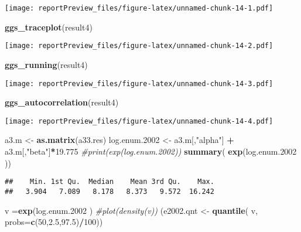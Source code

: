 \documentclass[]{article}
\newenvironment{Shaded}{\begin{snugshade}}{\end{snugshade}}
\newcommand{\KeywordTok}[1]{\textcolor[rgb]{0.13,0.29,0.53}{\textbf{#1}}}
\newcommand{\DataTypeTok}[1]{\textcolor[rgb]{0.13,0.29,0.53}{#1}}
\newcommand{\DecValTok}[1]{\textcolor[rgb]{0.00,0.00,0.81}{#1}}
\newcommand{\FloatTok}[1]{\textcolor[rgb]{0.00,0.00,0.81}{#1}}
\newcommand{\StringTok}[1]{\textcolor[rgb]{0.31,0.60,0.02}{#1}}
\newcommand{\CommentTok}[1]{\textcolor[rgb]{0.56,0.35,0.01}{\textit{#1}}}
\newcommand{\OperatorTok}[1]{\textcolor[rgb]{0.81,0.36,0.00}{\textbf{#1}}}
\newcommand{\NormalTok}[1]{#1}
\begin{document}
\texttt{[image: reportPreview\_files/figure-latex/unnamed-chunk-14-1.pdf]}

\begin{Shaded}
\begin{Highlighting}[]
\KeywordTok{ggs_traceplot}\NormalTok{(result4)}
\end{Highlighting}
\end{Shaded}

\texttt{[image: reportPreview\_files/figure-latex/unnamed-chunk-14-2.pdf]}

\begin{Shaded}
\begin{Highlighting}[]
\KeywordTok{ggs_running}\NormalTok{(result4)}
\end{Highlighting}
\end{Shaded}

\texttt{[image: reportPreview\_files/figure-latex/unnamed-chunk-14-3.pdf]}

\begin{Shaded}
\begin{Highlighting}[]
\KeywordTok{ggs_autocorrelation}\NormalTok{(result4)}
\end{Highlighting}
\end{Shaded}

\texttt{[image: reportPreview\_files/figure-latex/unnamed-chunk-14-4.pdf]}

\begin{Shaded}
\begin{Highlighting}[]
\NormalTok{ a3.m <-}\StringTok{ }\KeywordTok{as.matrix}\NormalTok{(a33.res)}
\NormalTok{log.enum.}\DecValTok{2002}\NormalTok{ <-}\StringTok{ }\NormalTok{a3.m[,}\StringTok{"alpha"}\NormalTok{] }\OperatorTok{+}\StringTok{ }\NormalTok{a3.m[,}\StringTok{"beta"}\NormalTok{]}\OperatorTok{*}\FloatTok{19.775}
\CommentTok{#print(exp(log.enum.2002))}
\KeywordTok{summary}\NormalTok{( }\KeywordTok{exp}\NormalTok{(log.enum.}\DecValTok{2002}\NormalTok{ ))}
\end{Highlighting}
\end{Shaded}

\begin{verbatim}
##    Min. 1st Qu.  Median    Mean 3rd Qu.    Max. 
##   3.904   7.089   8.178   8.373   9.572  16.242
\end{verbatim}

\begin{Shaded}
\begin{Highlighting}[]
\NormalTok{v =}\KeywordTok{exp}\NormalTok{(log.enum.}\DecValTok{2002}\NormalTok{ )}
\CommentTok{#plot(density(v))}
\NormalTok{(e2002.qnt <-}\StringTok{ }\KeywordTok{quantile}\NormalTok{( v, }\DataTypeTok{probs=}\KeywordTok{c}\NormalTok{(}\DecValTok{50}\NormalTok{,}\FloatTok{2.5}\NormalTok{,}\FloatTok{97.5}\NormalTok{)}\OperatorTok{/}\DecValTok{100}\NormalTok{))}
\end{Highlighting}
\end{Shaded}
\end{document}
